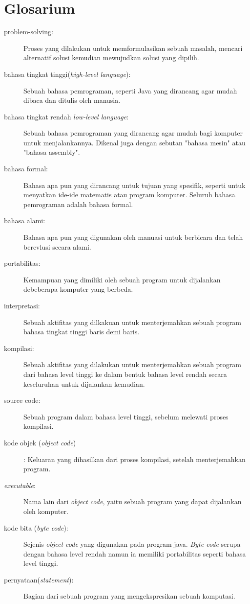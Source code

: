 \section{Glosarium}
\begin{description}
	\item[problem-solving:] Proses yang dilakukan untuk memformulasikan sebuah masalah, mencari alternatif solusi kemudian mewujudkan solusi yang dipilih.
	\item[bahasa tingkat tinggi(\textit{high-level language}):] Sebuah bahasa pemrograman, seperti Java yang dirancang agar mudah dibaca dan ditulis oleh manusia.
	\item[bahasa tingkat rendah \textit{low-level language}:] Sebuah bahasa pemrograman yang dirancang agar mudah bagi komputer untuk menjalankannya. Dikenal juga dengan sebutan "bahasa mesin" atau "bahasa assembly".
	\item[bahasa formal:] Bahasa apa pun yang dirancang untuk tujuan yang spesifik, seperti untuk menyatkan ide-ide matematis atau program komputer. Seluruh bahasa pemrograman adalah bahasa formal.
	\item[bahasa alami:] Bahasa apa pun yang digunakan oleh manuasi untuk berbicara dan telah berevlusi sceara alami.
	\item[portabilitas:] Kemampuan yang dimiliki oleh sebuah program untuk dijalankan debeberapa komputer yang berbeda.
	\item[interpretasi:] Sebuah aktifitas yang dilkakuan untuk menterjemahkan sebuah program bahasa tingkat tinggi baris demi baris.
	\item[kompilasi:] Sebuah aktifitas yang dilakukan untuk menterjemahkan sebuah program dari bahasa level tinggi ke dalam bentuk bahasa level rendah secara keseluruhan untuk dijalankan kemudian.
	\item[source code:] Sebuah program dalam bahasa level tinggi, sebelum melewati proses kompilasi.
	\item[kode objek (\textit{object code})]: Keluaran yang dihasilkan dari proses kompilasi, setelah menterjemahkan program.
	\item[\textit{executable}:] Nama lain dari\textit{ object code}, yaitu sebuah program yang dapat dijalankan oleh komputer.
	\item[kode bita (\textit{byte code}):] Sejenis \textit{object code} yang digunakan pada program java.\textit{ Byte code} serupa dengan bahasa level rendah namun ia memiliki portabilitas seperti bahasa level tinggi.
    \item[pernyataan(\textit{statement}):] Bagian dari sebuah program yang mengekspresikan sebuah komputasi.

\end{description}
